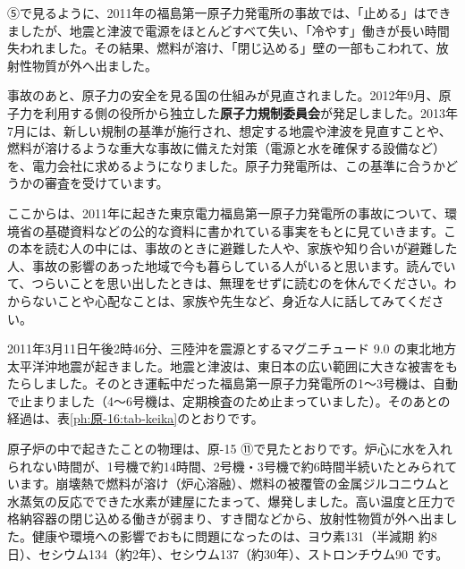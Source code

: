⑤で見るように、2011年の福島第一原子力発電所の事故では、「止める」はできましたが、地震と津波で電源をほとんどすべて失い、「冷やす」働きが長い時間失われました。その結果、燃料が溶け、「閉じ込める」壁の一部もこわれて、放射性物質が外へ出ました。

事故のあと、原子力の安全を見る国の仕組みが見直されました。2012年9月、原子力を利用する側の役所から独立した\textbf{原子力規制委員会}が発足しました。2013年7月には、新しい規制の基準が施行され、想定する地震や津波を見直すことや、燃料が溶けるような重大な事故に備えた対策（電源と水を確保する設備など）を、電力会社に求めるようになりました。原子力発電所は、この基準に合うかどうかの審査を受けています。

\leavevmode\label{ph:原-16:sec5}ここからは、2011年に起きた東京電力福島第一原子力発電所の事故について、環境省の基礎資料などの公的な資料に書かれている事実をもとに見ていきます。この本を読む人の中には、事故のときに避難した人や、家族や知り合いが避難した人、事故の影響のあった地域で今も暮らしている人がいると思います。読んでいて、つらいことを思い出したときは、無理をせずに読むのを休んでください。わからないことや心配なことは、家族や先生など、身近な人に話してみてください。

2011年3月11日午後2時46分、三陸沖を震源とするマグニチュード 9.0 の東北地方太平洋沖地震が起きました。地震と津波は、東日本の広い範囲に大きな被害をもたらしました。そのとき運転中だった福島第一原子力発電所の1〜3号機は、自動で止まりました（4〜6号機は、定期検査のため止まっていました）。そのあとの経過は、表\ref{ph:原-16:tab-keika}のとおりです。

原子炉の中で起きたことの物理は、原-15 ⑪で見たとおりです。炉心に水を入れられない時間が、1号機で約14時間、2号機・3号機で約6時間半続いたとみられています。崩壊熱で燃料が溶け（炉心溶融）、燃料の被覆管の金属ジルコニウムと水蒸気の反応でできた水素が建屋にたまって、爆発しました。高い温度と圧力で格納容器の閉じ込める働きが弱まり、すき間などから、放射性物質が外へ出ました。健康や環境への影響でおもに問題になったのは、ヨウ素131（半減期 約8日）、セシウム134（約2年）、セシウム137（約30年）、ストロンチウム90 です。

